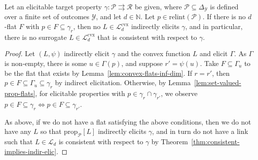 \documentclass[anon,12pt]{colt2021} %
\newcommand{\Comments}{1}
\newcommand{\mynote}[2]{\ifnum\Comments=1\textcolor{#1}{#2}\fi}
\newcommand{\jessie}[1]{\mynote{purple}{[JF: #1]}}
\newcommand{\simplex}{\Delta_\Y}
\newcommand{\relint}[1]{\mathrm{relint}(#1)}
\newcommand{\prop}[2][\mathcal{P}]{\mathrm{prop}_{#1}[#2]}
\newcommand{\range}{\mathrm{range}\,}
\newcommand{\Pcodimension}{$\mathcal{P}$-codimension\,}
\renewcommand{\L}{\mathcal{L}}
\newcommand{\Lcvx}{\mathcal{L}^{\text{cvx}}}
\newcommand{\R}{\mathcal{R}}
\renewcommand{\P}{\mathcal{P}}
\newcommand{\Y}{\mathcal{Y}}
\newcommand{\toto}{\rightrightarrows}
\begin{document}

\begin{corollary}\label{cor:Pcodim-flat-elic-relint-prop} 
  Let an elicitable target property $\gamma:\P \toto \R$ be given, where $\P\subseteq\simplex$ is defined over a finite set of outcomes $\Y$, and let $d\in\mathbb N$.
Let $p \in \relint{\P}$.
If there is no $d$-flat $F$ with $p \in F \subseteq \gamma_r$, then no $L\in\Lcvx_d$ indirectly elicits $\gamma$, and in particular, there is no surrogate $L \in \Lcvx_d$ that is consistent with respect to $\gamma$.
%
\end{corollary}
\begin{proof}
	Let $(L, \psi)$ indirectly elicit $\gamma$ and the convex function $L$ and elicit $\Gamma$.
	As $\Gamma$ is non-empty, there is some $u \in \Gamma(p)$, and suppose $r' = \psi(u)$.
	Take $F \subseteq \Gamma_u$ to be the flat that exists by Lemma~\ref{lem:convex-flats-inf-dim}.
	If $r = r'$, then $p \in F \subseteq \Gamma_u \subseteq \gamma_r$ by indirect elicitation.
	Otherwise, by Lemma~\ref{lem:set-valued-prop-flats}, for elicitable properties with $p \in \gamma_r \cap \gamma_{r'}$, we observe $p \in F\subseteq \gamma_r \iff p \in F \subseteq \gamma_{r'}$.
	
	As above, if we do not have a flat satisfying the above conditions, then we do not have any $L$ so that $\prop{L}$ indirectly elicits $\gamma$, and in turn do not have a link such that $L \in \L_d$ is consistent with respect to $\gamma$ by Theorem~\ref{thm:consistent-implies-indir-elic}.
\end{proof}
\end{document}
